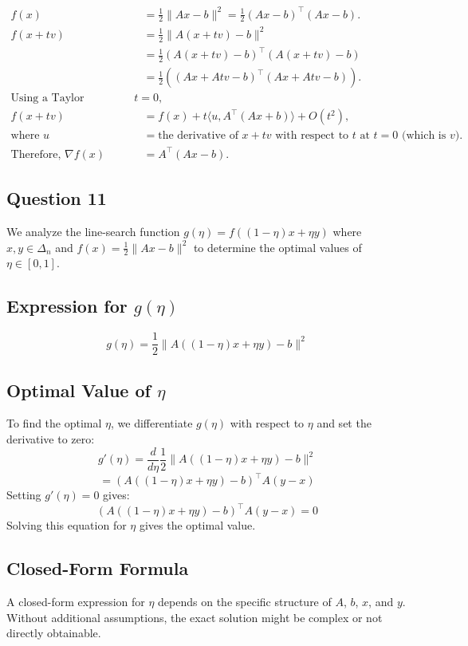 \documentclass[12p]{article}
\begin{document}
\begin{align*}
f(x) &= \frac{1}{2} \|Ax - b\|^2 = \frac{1}{2} (Ax - b)^\top (Ax - b). \\
f(x + tv) &= \frac{1}{2} \|A(x + tv) - b\|^2 \\
&= \frac{1}{2} (A(x + tv) - b)^\top (A(x + tv) - b) \\
&= \frac{1}{2} ((Ax + Atv - b)^\top (Ax + Atv - b)). \\
\text{Using a Taylor expansion around } t = 0, \\
f(x + tv) &= f(x) + t \langle u, A^\top (Ax + b) \rangle + O(t^2), \\
\text{where } u &= \text{the derivative of } x + tv \text{ with respect to } t \text{ at } t = 0 \text{ (which is } v \text{)}. \\
\text{Therefore, } \nabla f(x) &= A^\top (Ax - b).
\end{align*}



\subsection*{Question 11} 

We analyze the line-search function \( g(\eta) = f((1 - \eta)x + \eta y) \) where \( x, y \in \Delta_n \) and \( f(x) = \frac{1}{2}\|Ax - b\|^2 \) to determine the optimal values of \( \eta \in [0, 1] \).

\subsection*{Expression for \( g(\eta) \)}
\[ g(\eta) = \frac{1}{2} \|A((1 - \eta)x + \eta y) - b\|^2 \]

\subsection*{Optimal Value of \( \eta \)}
To find the optimal \(\eta\), we differentiate \(g(\eta)\) with respect to \(\eta\) and set the derivative to zero:
\[ g'(\eta) = \frac{d}{d\eta} \frac{1}{2} \|A((1 - \eta)x + \eta y) - b\|^2 \]
\[ = (A((1 - \eta)x + \eta y) - b)^\top A(y - x) \]
Setting \( g'(\eta) = 0 \) gives:
\[ (A((1 - \eta)x + \eta y) - b)^\top A(y - x) = 0 \]
Solving this equation for \(\eta\) gives the optimal value.

\subsection*{Closed-Form Formula}
A closed-form expression for \(\eta\) depends on the specific structure of \(A\), \(b\), \(x\), and \(y\). Without additional assumptions, the exact solution might be complex or not directly obtainable.
\end{document}

